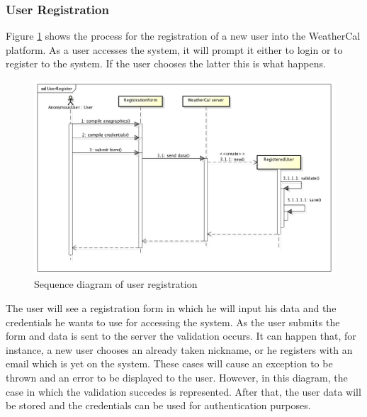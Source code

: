 \subsubsection{User Registration}
Figure \ref{fig:regseqdiag} shows the process for the registration of a new user into the WeatherCal platform. As a user accesses the system, it will prompt it either to login or to register to the system. If the user chooses the latter this is what happens.
\begin{center}
 \begin{figure}[H]
    \includegraphics[width=1\textwidth]{../UMLDiagram/sequence/UserRegister/UserRegister.png}
    \caption{Sequence diagram of user registration}
     \label{fig:regseqdiag}
     \end{figure}
   \end{center}  
The user will see a registration form in which he will input his data and the credentials he wants to use for accessing the system. As the user submits the form and data is sent to the server the validation occurs. It can happen that, for instance, a new user chooses an already taken nickname, or he registers with an email which is yet on the system. These cases will cause an exception to be thrown and an error to be displayed to the user. However, in this diagram, the case in which the validation succedes is represented. After that, the user data will be stored and the credentials can be used for authentication purposes.
